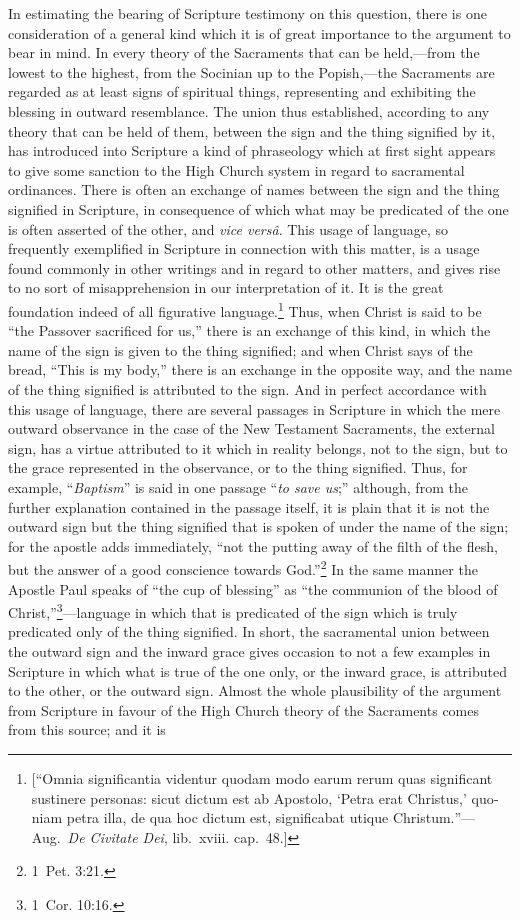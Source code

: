 \documentclass[
]{book}
\begin{document}
In estimating the bearing of Scripture testimony on this question, there is one consideration of a general kind which it is of great importance to the argument to bear in mind. In every theory of the Sacraments that can be held,---from the lowest to the highest, from the Socinian up to the Popish,---the Sacraments are regarded as at least signs of spiritual things, representing and exhibiting the blessing in outward resemblance. The union thus established, according to any theory that can be held of them, between the sign and the thing signified by it, has introduced into Scripture a kind of phraseology which at first sight appears to give some sanction to the High Church system in regard to sacramental ordinances. There is often an exchange of names between the sign and the thing signified in Scripture, in consequence of which what may be predicated of the one is often asserted of the other, and \foreignlanguage{latin}{\emph{vice versâ}}. This usage of language, so frequently exemplified in Scripture in connection with this matter, is a usage found commonly in other writings and in regard to other matters, and gives rise to no sort of misapprehension in our interpretation of it. It is the great foundation indeed of all figurative language.\footnote{{[}``\foreignlanguage{latin}{Omnia significantia videntur quodam modo earum rerum quas significant sustinere personas: sicut dictum est ab Apostolo, `Petra erat Christus,' quoniam petra illa, de qua hoc dictum est, significabat utique Christum.}''---Aug.~\foreignlanguage{latin}{\emph{De Civitate Dei}}, lib.~xviii. cap.~48.{]}} Thus, when Christ is said to be ``the Passover sacrificed for us,'' there is an exchange of this kind, in which the name of the sign is given to the thing signified; and when Christ says of the bread, ``This is my body,'' there is an exchange in the opposite way, and the name of the thing signified is attributed to the sign. And in perfect accordance with this usage of language, there are several passages in Scripture in which the mere outward observance in the case of the New Testament Sacraments, the external sign, has a virtue attributed to it which in reality belongs, not to the sign, but to the grace represented in the observance, or to the thing signified. Thus, for example, ``\emph{Baptism}'' is said in one passage ``\emph{to save us};'' although, from the further explanation contained in the passage itself, it is plain that it is not the outward sign but the thing signified that is spoken of under the name of the sign; for the apostle adds immediately, ``not the putting away of the filth of the flesh, but the answer of a good conscience towards God.''\footnote{1~Pet. 3:21.} In the same manner the Apostle Paul speaks of ``the cup of blessing'' as ``the communion of the blood of Christ,''\footnote{1~Cor. 10:16.}---language in which that is predicated of the sign which is truly predicated only of the thing signified. In short, the sacramental union between the outward sign and the inward grace gives occasion to not a few examples in Scripture in which what is true of the one only, or the inward grace, is attributed to the other, or the outward sign. Almost the whole plausibility of the argument from Scripture in favour of the High Church theory of the Sacraments comes from this source; and it is 
\end{document}
